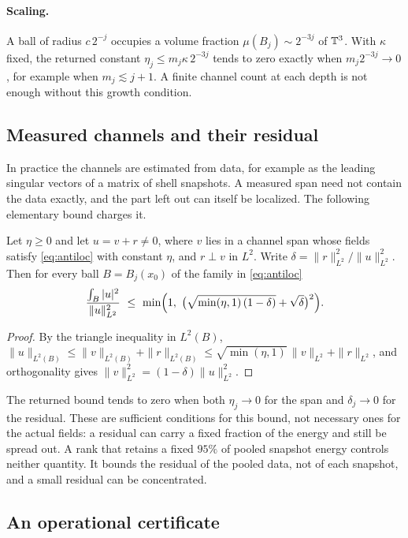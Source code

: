 \paragraph{Scaling.}
A ball of radius $c\,2^{-j}$ occupies a volume fraction $\mu(B_j)\sim2^{-3j}$ of $\mathbb{T}^3$. With $\kappa$
fixed, the returned constant $\eta_j\le m_j\kappa\,2^{-3j}$ tends to zero exactly when
$m_j2^{-3j}\to0$, for example when $m_j\lesssim j+1$. A finite channel count at each depth is not
enough without this growth condition.

\subsection{Measured channels and their residual}

In practice the channels are estimated from data, for example as the leading singular vectors of a
matrix of shell snapshots. A measured span need not contain the data exactly, and the part left out
can itself be localized. The following elementary bound charges it.

\begin{lemma}\label{lem:residual}
Let $\eta\ge0$ and let $u=v+r\ne0$, where $v$ lies in a channel span whose fields satisfy
\eqref{eq:antiloc} with constant $\eta$, and $r\perp v$ in $L^2$. Write $\delta=\|r\|_{L^2}^2/\|u\|_{L^2}^2$.
Then for every ball $B=B_j(x_0)$ of the family in \eqref{eq:antiloc}
\[
\frac{\int_B|u|^2}{\|u\|_{L^2}^2}\ \le\ \min\Bigl(1,\ \bigl(\sqrt{\min(\eta,1)\,(1-\delta)}+\sqrt\delta\bigr)^2\Bigr).
\]
\end{lemma}

\begin{proof}
By the triangle inequality in $L^2(B)$,
$\|u\|_{L^2(B)}\le\|v\|_{L^2(B)}+\|r\|_{L^2(B)}\le\sqrt{\min(\eta,1)}\,\|v\|_{L^2}+\|r\|_{L^2}$, and
orthogonality gives $\|v\|_{L^2}^2=(1-\delta)\|u\|_{L^2}^2$.
\end{proof}

The returned bound tends to zero when both $\eta_j\to0$ for the span and $\delta_j\to0$ for the
residual. These are sufficient conditions for this bound, not necessary ones for the actual fields:
a residual can carry a fixed fraction of the energy and still be spread out. A rank that retains a
fixed $95\%$ of pooled snapshot energy controls neither quantity. It bounds the residual of the pooled data, not of each snapshot, and a small
residual can be concentrated.

\subsection{An operational certificate}

